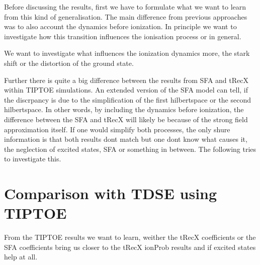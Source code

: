 Before discussing the results, first we have to formulate what we want to learn from this kind of generalisation. 
The main difference from previous approaches was to also account the dynamics before ionization.
In principle we want to investigate how this transition influences the ionisation process or in general.

We want to investigate what influences the ionization dynamics more, the stark shift or the distortion of the ground state.

Further there is quite a big difference between the results from SFA and tRecX within TIPTOE simulations. 
An extended version of the SFA model can tell, if the discrpancy is due to the simplification of the first hilbertspace or the second hilbertspace.
In other words, by including the dynamics before ionization, the difference between the SFA and tRecX will likely be because of the strong field approximation itself.
If one would simplify both processes, the only shure information is that both results dont match but one dont know what causes it, the neglection of excited states, SFA or something in between.
The following tries to investigate this.





\section{Comparison with TDSE using TIPTOE}
From the TIPTOE results we want to learn, weither the tRecX coefficients or the SFA coefficients bring us closer to the tRecX ionProb results and if excited states help at all.

